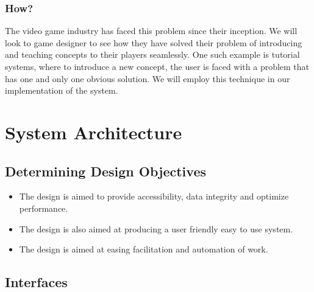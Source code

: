 \documentclass[11pt]{article}
\begin{document}
\subsubsection{How?}
The video game industry has faced this problem since their inception. We will look to game designer to see how they have solved their problem of introducing and teaching concepts to their players seamlessly. One such example is tutorial systems, where to introduce a new concept, the user is faced with a problem that has one and only one obvious solution. We will employ this technique in our implementation of the system.

\section{System Architecture}
\subsection{Determining Design Objectives}
\begin{itemize}
\item The design is aimed to provide accessibility, data integrity and optimize performance.
\item The design is also aimed at producing a user friendly easy to use system.
\item The design is aimed at easing facilitation and automation of work.
\end{itemize}

\subsection{Interfaces}
\end{document}
